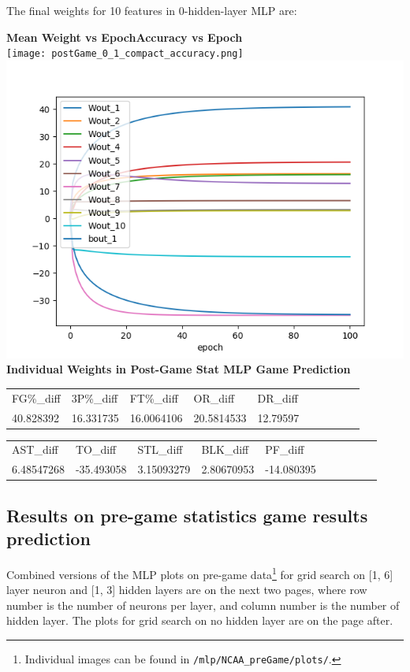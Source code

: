\documentclass[12pt]{article}
\begin{document}
\quad The final weights for 10 features in 0-hidden-layer MLP are: \newpage

\textbf{Mean Weight vs Epoch\qquad \qquad Accuracy vs Epoch} \\
\texttt{[image: postGame\_0\_1\_compact\_accuracy.png]} 
\includegraphics[scale=0.4]{postGame_0_1_detailed_weights.png} \\

\textbf{Individual Weights in Post-Game Stat MLP Game Prediction}


\begin{tabular}{llllllllll}
FG\%\_diff & 3P\%\_diff & FT\%\_diff  & OR\_diff   & DR\_diff \\
40.828392  & 16.331735  & 16.0064106  & 20.5814533 & 12.79597 
\end{tabular} 

\begin{tabular}{llllllllll}
AST\_diff &TO\_diff & STL\_diff & BLK\_diff& PF\_diff\\
6.48547268  &-35.493058 & 3.15093279 & 2.80670953 & -14.080395
\end{tabular}



\subsection{Results on pre-game statistics game results prediction}
\quad Combined versions of the MLP plots on pre-game data\footnote{Individual images can be found in \texttt{/mlp/NCAA\_preGame/plots/}.} for grid search on [1, 6] layer neuron and [1, 3] hidden layers are on the next two pages, where row number is the number of neurons per layer, and column number is the number of hidden layer. The plots for grid search on no hidden layer are on the page after. \newpage
\end{document}
